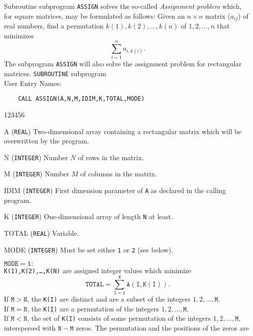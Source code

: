                            
                       
\Submitter{}                               
                          
Subroutine subprogram {\tt ASSIGN} solves the so-called
{\it Assignment problem} which, for square matrices, may
be formulated as follows:
Given an $n \times n$ matrix ($a_{ij}$) of real numbers, find a
permutation $k(1),k(2),\ldots,k(n)$ of $1,2,\ldots,n$ that minimizes
$$ \sum_{i=1}^n a_{i,k(i)}.$$
The subprogram {\tt ASSIGN} will also solve the assignment
problem for rectangular matrices.
\Structure
{\tt SUBROUTINE} subprogram \\
User Entry Names: 
\Usage
\begin{verbatim}
    CALL ASSIGN(A,N,M,IDIM,K,TOTAL,MODE)
\end{verbatim}
\begin{DLtt}{123456}
\item[A] ({\tt REAL}) Two-dimensional array containing a rectangular
matrix which will be overwritten by the program.
\item[N]({\tt INTEGER}) Number $N$ of rows in the matrix.
\item[M]({\tt INTEGER}) Number $M$ of columns in the matrix.
\item [IDIM]({\tt INTEGER}) First dimension parameter of {\tt A}
as declared in the calling program.
\item[K] ({\tt INTEGER}) One-dimensional array of length {\tt N} at
least.
\item [TOTAL] ({\tt REAL}) Variable.
\item [MODE] ({\tt INTEGER}) Must be set either {\tt 1} or {\tt 2}
(see below).
\end{DLtt}
$\mathtt{MODE=1}:$ \\[2mm]
{\tt K(1),K(2),\ldots,K(N)} are assigned integer values which minimize
$$\mathtt{TOTAL = \sum_{I=1}^N A(I,K(I))}.$$
If $\mathtt{M > N}$, the {\tt K(I)} are distinct and are a subset of
the integers $1,2,\ldots,\mathtt{M}$. \\
If $\mathtt{M = N}$, the {\tt K(I)} are a permutation of the integers
$1,2,\ldots,\mathtt{M}$. \\
If $\mathtt{M<N}$, the set of {\tt K(I)} consists of some permutation of
the integers $1,2,\ldots,\mathtt{M}$, interspersed with
$\mathtt{N-M}$ zeros. The permutation and the positions of the zeros are
